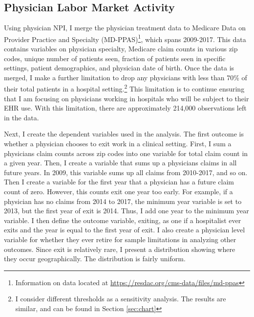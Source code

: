 \documentclass[12pt]{article}
\begin{document}
\subsection{Physician Labor Market Activity}\label{sec:appmdppas}

Using physician NPI, I merge the physician treatment data to Medicare Data on Provider Practice and Specialty (MD-PPAS)\footnote{Information on data located at \hyperlink{https://resdac.org/cms-data/files/md-ppas}{https://resdac.org/cms-data/files/md-ppas}}, which spans 2009-2017. This data contains variables on physician specialty, Medicare claim counts in various zip codes, unique number of patients seen, fraction of patients seen in specific settings, patient demographics, and physician date of birth. Once the data is merged, I make a further limitation to drop any physicians with less than 70\% of their total patients in a hospital setting.\footnote{I consider different thresholds as a sensitivity analysis. The results are similar, and can be found in Section \ref{sec:chart}} This limitation is to continue ensuring that I am focusing on physicians working in hospitals who will be subject to their EHR use. With this limitation, there are approximately 214,000 observations left in the data. 

Next, I create the dependent variables used in the analysis. The first outcome is whether a physician chooses to exit work in a clinical setting. First, I sum a physicians claim counts across zip codes into one variable for total claim count in a given year. Then, I create a variable that sums up a physicians claims in all future years. In 2009, this variable sums up all claims from 2010-2017, and so on. Then I create a variable for the first year that a physician has a future claim count of zero. However, this counts exit one year too early. For example, if a physician has no claims from 2014 to 2017, the minimum year variable is set to 2013, but the first year of exit is 2014. Thus, I add one year to the minimum year variable. I then define the outcome variable, exiting, as one if a hospitalist ever exits and the year is equal to the first year of exit. I also create a physician level variable for whether they ever retire for sample limitations in analyzing other outcomes. Since exit is relatively rare, I present a distribution showing where they occur geographically. The distribution is fairly uniform.
\end{document}

